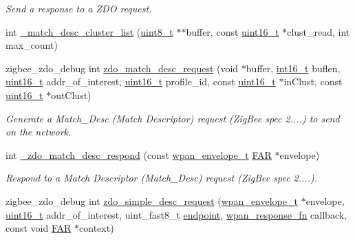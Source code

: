 \begin{DoxyCompactItemize}
\begin{DoxyCompactList}\small\item\em Send a response to a Z\-D\-O request. \end{DoxyCompactList}\item 
int \hyperlink{group__zdo_ga1a65d88af9f0c9906d548aa1ff2586f7}{\-\_\-match\-\_\-desc\-\_\-cluster\-\_\-list} (\hyperlink{group__hal_gae1affc9ca37cfb624959c866a73f83c2}{uint8\-\_\-t} $\ast$$\ast$buffer, const \hyperlink{group__hal_ga5a8b2dc9e45a9ee81a94ef304fb62505}{uint16\-\_\-t} $\ast$clust\-\_\-read, int max\-\_\-count)
\item 
zigbee\-\_\-zdo\-\_\-debug int \hyperlink{group__zdo_ga5746efffb4b90718eb973796f2b4bb41}{zdo\-\_\-match\-\_\-desc\-\_\-request} (void $\ast$buffer, \hyperlink{group__hal_ga2140805d08462d474b82ddc8d1c2f3e6}{int16\-\_\-t} buflen, \hyperlink{group__hal_ga5a8b2dc9e45a9ee81a94ef304fb62505}{uint16\-\_\-t} addr\-\_\-of\-\_\-interest, \hyperlink{group__hal_ga5a8b2dc9e45a9ee81a94ef304fb62505}{uint16\-\_\-t} profile\-\_\-id, const \hyperlink{group__hal_ga5a8b2dc9e45a9ee81a94ef304fb62505}{uint16\-\_\-t} $\ast$in\-Clust, const \hyperlink{group__hal_ga5a8b2dc9e45a9ee81a94ef304fb62505}{uint16\-\_\-t} $\ast$out\-Clust)
\begin{DoxyCompactList}\small\item\em Generate a Match\-\_\-\-Desc (Match Descriptor) request (Zig\-Bee spec 2....) to send on the network. \end{DoxyCompactList}\item 
int \hyperlink{group__zdo_ga41d93e5e12d9ed4e18d092fe3af779a2}{\-\_\-zdo\-\_\-match\-\_\-desc\-\_\-respond} (const \hyperlink{structwpan__envelope__t}{wpan\-\_\-envelope\-\_\-t} \hyperlink{group__hal_gaef060b3456fdcc093a7210a762d5f2ed}{F\-A\-R} $\ast$envelope)
\begin{DoxyCompactList}\small\item\em Respond to a Match Descriptor (Match\-\_\-\-Desc) request (Zig\-Bee spec 2....). \end{DoxyCompactList}\item 
zigbee\-\_\-zdo\-\_\-debug int \hyperlink{group__zdo_gafbbece379bc09af360099d1e0825d507}{zdo\-\_\-simple\-\_\-desc\-\_\-request} (\hyperlink{structwpan__envelope__t}{wpan\-\_\-envelope\-\_\-t} $\ast$envelope, \hyperlink{group__hal_ga5a8b2dc9e45a9ee81a94ef304fb62505}{uint16\-\_\-t} addr\-\_\-of\-\_\-interest, uint\-\_\-fast8\-\_\-t \hyperlink{group__zdo_ga7d397493728da2bca8d55b2d61c4ec5d}{endpoint}, \hyperlink{group__wpan__aps_gaffe7bb679e9ba6de49f68fdc584fbefb}{wpan\-\_\-response\-\_\-fn} callback, const void \hyperlink{group__hal_gaef060b3456fdcc093a7210a762d5f2ed}{F\-A\-R} $\ast$context)
$$
\end{DoxyCompactItemize}
